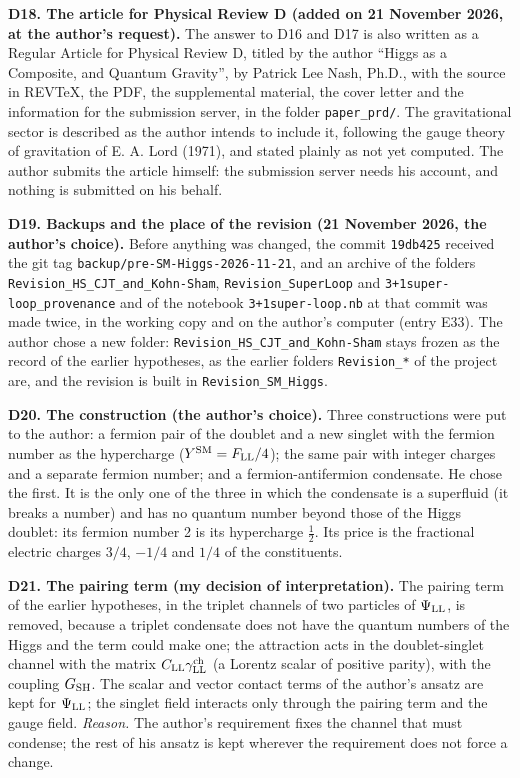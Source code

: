\documentclass[
  10pt,
]{article}
\begin{document}
\textbf{D18. The article for Physical Review D (added on 21 November
2026, at the author's request).} The answer to D16 and D17 is also
written as a Regular Article for Physical Review D, titled by the author
``Higgs as a Composite, and Quantum Gravity'', by Patrick Lee Nash,
Ph.D., with the source in REVTeX, the PDF, the supplemental material,
the cover letter and the information for the submission server, in the
folder \texttt{paper\_prd/}. The gravitational sector is described as
the author intends to include it, following the gauge theory of
gravitation of E. A. Lord (1971), and stated plainly as not yet
computed. The author submits the article himself: the submission server
needs his account, and nothing is submitted on his behalf.

\textbf{D19. Backups and the place of the revision (21 November 2026,
the author's choice).} Before anything was changed, the commit
\texttt{19db425} received the git tag
\texttt{backup/pre-SM-Higgs-2026-11-21}, and an archive of the folders
\texttt{Revision\_HS\_CJT\_and\_Kohn-Sham}, \texttt{Revision\_SuperLoop}
and \texttt{3+1super-loop\_provenance} and of the notebook
\texttt{3+1super-loop.nb} at that commit was made twice, in the working
copy and on the author's computer (entry E33). The author chose a new
folder: \texttt{Revision\_HS\_CJT\_and\_Kohn-Sham} stays frozen as the
record of the earlier hypotheses, as the earlier folders
\texttt{Revision\_*} of the project are, and the revision is built in
\texttt{Revision\_SM\_Higgs}.

\textbf{D20. The construction (the author's choice).} Three
constructions were put to the author: a fermion pair of the doublet and
a new singlet with the fermion number as the hypercharge
(\(Y^{\rm SM}=F_{\rm LL}/4\)); the same pair with integer charges and a
separate fermion number; and a fermion-antifermion condensate. He chose
the first. It is the only one of the three in which the condensate is a
superfluid (it breaks a number) and has no quantum number beyond those
of the Higgs doublet: its fermion number 2 is its hypercharge
\(\tfrac12\). Its price is the fractional electric charges \(3/4\),
\(-1/4\) and \(1/4\) of the constituents.

\textbf{D21. The pairing term (my decision of interpretation).} The
pairing term of the earlier hypotheses, in the triplet channels of two
particles of \(\Psi_{\rm LL}\), is removed, because a triplet condensate
does not have the quantum numbers of the Higgs and the term could make
one; the attraction acts in the doublet-singlet channel with the matrix
\(C_{\rm LL}\gamma^{\rm ch}_{\rm LL}\) (a Lorentz scalar of positive
parity), with the coupling \(G_{\rm SH}\). The scalar and vector contact
terms of the author's ansatz are kept for \(\Psi_{\rm LL}\); the singlet
field interacts only through the pairing term and the gauge field.
\emph{Reason.} The author's requirement fixes the channel that must
condense; the rest of his ansatz is kept wherever the requirement does
not force a change.
\end{document}
